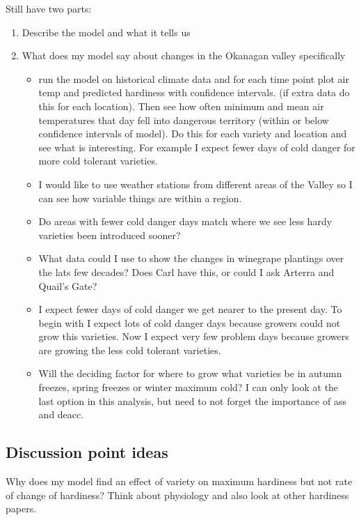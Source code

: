 \documentclass[11pt,letter]{article}
\begin{document}
Still have two parts:
\begin{enumerate}
  \item Describe the model and what it tells us
  \item What does my model say about changes in the Okanagan valley specifically 
  \begin{itemize}
    \item run the model on historical climate data and for each time point plot air temp and predicted hardiness with confidence intervals. (if extra data do this for each location). Then see how often minimum and mean air temperatures that day fell into dangerous territory (within or below confidence intervals of model). Do this for each variety and location and see what is interesting. For example I expect fewer days of cold danger for more cold tolerant varieties. 
    \item I would like to use weather stations from different areas of the Valley so I can see how variable things are within a region. 
    \item Do areas with fewer cold danger days match where we see less hardy varieties been introduced sooner?  
    \item What data could I use to show the changes in winegrape plantings over the lats few decades? Does Carl have this, or could I ask Arterra and Quail's Gate?
    \item I expect fewer days of cold danger we get nearer to the present day. To begin with I expect lots of cold danger days because growers could not grow this varieties. Now I expect very few problem days because growers are growing the less cold tolerant varieties. 
    \item Will the deciding factor for where to grow what varieties be in autumn freezes, spring freezes or winter maximum cold? I can only look at the last option in this analysis, but need to not forget the importance of ass and deacc.  
  \end{itemize}
\end{enumerate}

\subsection{Discussion point ideas}

Why does my model find an effect of variety on maximum hardiness but not rate of change of hardiness? Think about physiology and also look at other hardiness papers. \\
\end{document}
